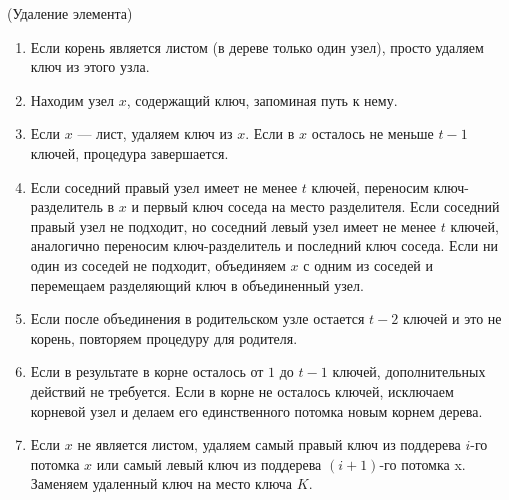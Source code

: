 \begin{algoritm}(Удаление элемента)
    \begin{enumerate}
        \item Если корень является листом (в дереве только один узел), просто удаляем ключ из этого узла.
        \item Находим узел $x$, содержащий ключ, запоминая путь к нему.
        \item  Если $x$ — лист, удаляем ключ из $x$.
        Если в $x$ осталось не меньше $t-1$ ключей, процедура завершается.
        \item Если соседний правый узел имеет не менее $t$ ключей, переносим ключ-разделитель в $x$ и первый ключ соседа на место разделителя. Если соседний правый узел не подходит, но соседний левый узел имеет не менее $t$ ключей, аналогично переносим ключ-разделитель и последний ключ соседа.
        Если ни один из соседей не подходит, объединяем $x$ с одним из соседей и перемещаем разделяющий ключ в объединенный узел.
        \item Если после объединения в родительском узле остается $t-2$ ключей и это не корень, повторяем процедуру для родителя.
        \item Если в результате в корне осталось от $1$ до $t-1$ ключей, дополнительных действий не требуется.
        Если в корне не осталось ключей, исключаем корневой узел и делаем его единственного потомка новым корнем дерева.
        \item Если $x$ не является листом, удаляем самый правый ключ из поддерева $i$-го потомка $x$ или самый левый ключ из поддерева $(i+1)$-го потомка x. Заменяем удаленный ключ на место ключа $K$.
    \end{enumerate}
\end{algoritm}
